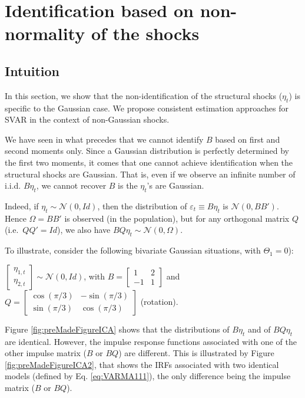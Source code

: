 \documentclass[
  12pt,
]{book}
\theoremstyle{definition}
\theoremstyle{definition}
\theoremstyle{definition}
\theoremstyle{definition}
\theoremstyle{remark}
\begin{document}
\hypertarget{NonGaussian}{%
\chapter{Identification based on non-normality of the shocks}\label{NonGaussian}}

\hypertarget{intuition}{%
\section{Intuition}\label{intuition}}

In this section, we show that the non-identification of the structural shocks (\(\eta_t\)) is specific to the Gaussian case. We propose consistent estimation approaches for SVAR in the context of non-Gaussian shocks.

We have seen in what precedes that we cannot identify \(B\) based on first and second moments only. Since a Gaussian distribution is perfectly determined by the first two moments, it comes that one cannot achieve identification when the structural shocks are Gaussian. That is, even if we observe an infinite number of i.i.d. \(B \eta_t\), we cannot recover \(B\) is the \(\eta_t\)'s are Gaussian.

Indeed, if \(\eta_t \sim \mathcal{N}(0,Id)\), then the distribution of \(\varepsilon_t \equiv B \eta_t\) is \(\mathcal{N}(0,BB')\). Hence \(\Omega = B B'\) is observed (in the population), but for any orthogonal matrix \(Q\) (i.e.~\(QQ'=Id\)), we also have \(BQ \eta_t \sim \mathcal{N}(0,\Omega)\).

To illustrate, consider the following bivariate Gaussian situations, with \(\Theta_1=0\)):

\(\left[\begin{array}{c}\eta_{1,t}\\ \eta_{2,t}\end{array}\right]\sim \mathcal{N}(0,Id)\), with
\(B = \left[\begin{array}{cc} 1 & 2 \\ -1 & 1 \end{array}\right]\) and
\(Q = \left[\begin{array}{cc} \cos(\pi/3) & -\sin(\pi/3) \\ \sin(\pi/3) & \cos(\pi/3) \end{array}\right]\) (rotation).

Figure \ref{fig:preMadeFigureICA} shows that the distributions of \(B \eta_t\) and of \(BQ\eta_t\) are identical. However, the impulse response functions associated with one of the other impulse matrix (\(B\) or \(BQ\)) are different. This is illustrated by Figure \ref{fig:preMadeFigureICA2}, that shows the IRFs associated with two identical models (defined by Eq. \eqref{eq:VARMA111}), the only difference being the impulse matrix (\(B\) or \(BQ\)).
\end{document}
